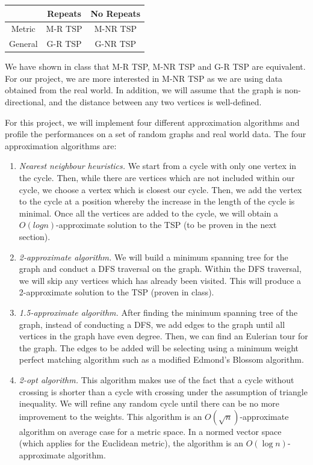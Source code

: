 \documentclass[paper=a4, fontsize=11pt]{scrartcl}	%
\numberwithin{equation}{section}		%
\numberwithin{figure}{section}			%
\numberwithin{table}{section}				%
\begin{document}
\begin{table}[h]
\centering
\begin{tabular}{|c|c|c|}
\hline
\multicolumn{1}{|l|}{} & Repeats & No Repeats \\ \hline
Metric                 & M-R TSP & M-NR TSP   \\ \hline
General                & G-R TSP & G-NR TSP   \\ \hline
\end{tabular}
\end{table}

We have shown in class that M-R TSP, M-NR TSP and G-R TSP are equivalent. For our project, we are more interested in M-NR TSP as we are using data obtained from the real world. In addition, we will assume that the graph is non-directional, and the distance between any two vertices is well-defined. 

For this project, we will implement four different approximation algorithms and profile the performances on a set of random graphs and real world data. The four approximation algorithms are:
\begin{enumerate}
\item \textit{Nearest neighbour heuristics.} We start from a cycle with only one vertex in the cycle. Then, while there are vertices which are not included within our cycle, we choose a vertex which is closest our cycle. Then, we add the vertex to the cycle at a position whereby the increase in the length of the cycle is minimal. Once all the vertices are added to the cycle, we will obtain a $O(log n)$-approximate solution to the TSP (to be proven in the next section).  
\item \textit{2-approximate algorithm.} We will build a minimum spanning tree for the graph and conduct a DFS traversal on the graph. Within the DFS traversal, we will skip any vertices which has already been visited. This will produce a 2-approximate solution to the TSP (proven in class).
\item \textit{1.5-approximate algorithm.} After finding the minimum spanning tree of the graph, instead of conducting a DFS, we add edges to the graph until all vertices in the graph have even degree. Then, we can find an Eulerian tour for the graph. The edges to be added will be selecting using a minimum weight perfect matching algorithm such as a modified Edmond's Blossom algorithm.\cite{kolmogorov}
\item \textit{2-opt algorithm.} This algorithm makes use of the fact that a cycle without crossing is shorter than a cycle with crossing under the assumption of triangle inequality. We will refine any random cycle until there can be no more improvement to the weights. This algorithm is an $O(\sqrt{n})$-approximate algorithm on average case for a metric space. \cite{christian} In a normed vector space (which applies for the Euclidean metric), the algorithm is an $O(\log n)$-approximate algorithm. 
\end{enumerate}
\end{document}

